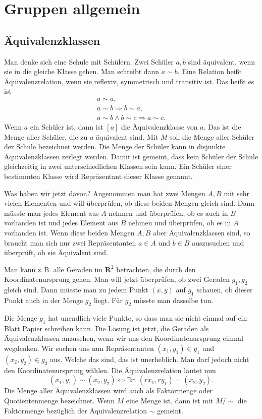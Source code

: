 \documentclass[a4paper,11pt,fleqn,twocolumn,twoside,dvipdfmx]{scrartcl}
\begin{document}
\section{Gruppen allgemein}

\subsection{Äquivalenzklassen}

Man denke sich eine Schule mit Schülern. Zwei Schüler $a,b$ sind
äquivalent, wenn sie in die gleiche Klasse gehen. Man schreibt
dann $a\sim b$. Eine Relation heißt Äquivalenzrelation, wenn sie
reflexiv, symmetrisch und transitiv ist. Das heißt es ist%
\begin{gather*}
a\sim a,\\
a\sim b \Rightarrow b\sim a,\\
a\sim b \wedge b\sim c \Rightarrow a\sim c.
\end{gather*}
Wenn $a$ ein Schüler ist, dann ist $[a]$ die Äquivalenzklasse von $a$.
Das ist die Menge aller Schüler, die zu $a$ äquivalent sind. Mit $M$
soll die Menge aller Schüler der Schule bezeichnet werden. Die Menge
der Schüler kann in disjunkte Äquivalenzklassen zerlegt werden. Damit
ist gemeint, dass kein Schüler der Schule gleichzeitig in zwei
unterschiedlichen Klassen sein kann. Ein Schüler einer bestimmten
Klasse wird Repräsentant dieser Klasse genannt.

Was haben wir jetzt davon? Angenommen man hat zwei Mengen $A,B$ mit
sehr vielen Elementen und will überprüfen, ob diese beiden Mengen
gleich sind. Dann müsste man jedes Element aus $A$ nehmen und
überprüfen, ob es auch in $B$ vorhanden ist und jedes Element aus
$B$ nehmen und überprüfen, ob es in $A$ vorhanden ist. Wenn diese
beiden Mengen $A,B$ aber Äquivalenzklassen sind, so braucht man sich
nur zwei Repräsentanten $a\in A$ und $b\in B$ auszusuchen und
überprüft, ob sie Äquivalent sind.

Man kann z.\,B. alle Geraden im $\mathbf R^2$ betrachten,
die durch den Koordinatenursprung gehen. Man will jetzt überprüfen,
ob zwei Geraden $g_1,g_2$ gleich sind. Dann müsste man zu jedem
Punkt $(x,y)$ auf $g_1$ schauen, ob dieser Punkt auch in der
Menge $g_2$ liegt. Für $g_2$ müsste man dasselbe tun.

Die Menge $g_1$ hat unendlich viele Punkte, so dass man sie nicht
einmal auf ein Blatt Papier schreiben kann. Die Lösung ist jetzt,
die Geraden als Äquivalenzklassen anzusehen, wenn wir uns den
Koordinatenursprung einmal wegdenken. Wir suchen uns nun
Repräsentanten $(x_1,y_1)\in g_1$ und $(x_2,y_2)\in g_2$ aus.
Welche das sind, das ist unerheblich. Man darf jedoch nicht den
Koordinatenursprung wählen. Die Äquivalenzrelation lautet nun%
\[(x_1,y_1)\sim (x_2,y_2) \Leftrightarrow
\exists r{:}\, (rx_1,ry_1)=(x_2,y_2).\]
%
Die Menge aller Äquivalenzklassen wird auch als Faktormenge oder
Quotientenmenge bezeichnet. Wenn $M$ eine Menge ist, dann ist mit
$M/{\sim}$ die Faktormenge bezüglich der Äquivalenzrelation $\sim$ gemeint.
\end{document}
